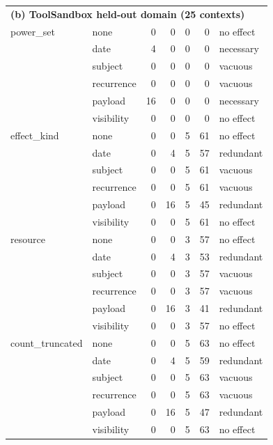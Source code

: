 \begin{table}[t]
\begin{tabular}{llrrrrl}
\midrule
\multicolumn{7}{l}{\textbf{(b) ToolSandbox held-out domain (25 contexts)}} \\
power\_set        & none       & 0  & 0  & 0 & 0   & no effect \\
                  & date       & 4  & 0  & 0 & 0   & necessary \\
                  & subject    & 0  & 0  & 0 & 0   & vacuous \\
                  & recurrence & 0  & 0  & 0 & 0   & vacuous \\
                  & payload    & 16 & 0  & 0 & 0   & necessary \\
                  & visibility & 0  & 0  & 0 & 0   & no effect \\
\midrule
effect\_kind      & none       & 0  & 0  & 5 & 61  & no effect \\
                  & date       & 0  & 4  & 5 & 57  & redundant \\
                  & subject    & 0  & 0  & 5 & 61  & vacuous \\
                  & recurrence & 0  & 0  & 5 & 61  & vacuous \\
                  & payload    & 0  & 16 & 5 & 45  & redundant \\
                  & visibility & 0  & 0  & 5 & 61  & no effect \\
\midrule
resource          & none       & 0  & 0  & 3 & 57  & no effect \\
                  & date       & 0  & 4  & 3 & 53  & redundant \\
                  & subject    & 0  & 0  & 3 & 57  & vacuous \\
                  & recurrence & 0  & 0  & 3 & 57  & vacuous \\
                  & payload    & 0  & 16 & 3 & 41  & redundant \\
                  & visibility & 0  & 0  & 3 & 57  & no effect \\
\midrule
count\_truncated  & none       & 0  & 0  & 5 & 63  & no effect \\
                  & date       & 0  & 4  & 5 & 59  & redundant \\
                  & subject    & 0  & 0  & 5 & 63  & vacuous \\
                  & recurrence & 0  & 0  & 5 & 63  & vacuous \\
                  & payload    & 0  & 16 & 5 & 47  & redundant \\
                  & visibility & 0  & 0  & 5 & 63  & no effect \\
\bottomrule
\end{tabular}


\end{table}

